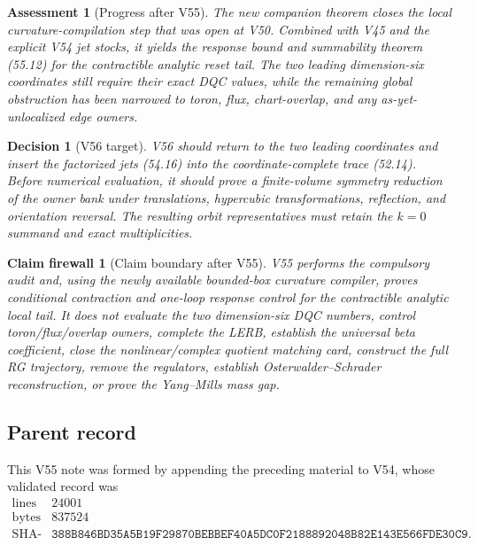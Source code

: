\documentclass[11pt,oneside]{book}
\newtheorem{assessment}[theorem]{Assessment}
\newtheorem{firewall}[theorem]{Claim firewall}
\newtheorem{decision}[theorem]{Decision}
\theoremstyle{definition}
\theoremstyle{remark}
\begin{document}
\begin{assessment}[Progress after V55]
\label{ass:e8v55-status}
The new companion theorem closes the local curvature-compilation
step that was open at V50.  Combined with V45 and the explicit V54
jet stocks, it yields the response bound and summability theorem
(55.12) for the contractible analytic reset tail.  The two leading
dimension-six coordinates still require their exact DQC values,
while the remaining global obstruction has been narrowed to toron,
flux, chart-overlap, and any as-yet-unlocalized edge owners.
\end{assessment}

\begin{decision}[V56 target]
\label{dec:e8v55-next}
V56 should return to the two leading coordinates and insert the
factorized jets (54.16) into the coordinate-complete trace (52.14).
Before numerical evaluation, it should prove a finite-volume
symmetry reduction of the owner bank under translations,
hypercubic transformations, reflection, and orientation reversal.
The resulting orbit representatives must retain the \(k=0\)
summand and exact multiplicities.
\end{decision}

\begin{firewall}[Claim boundary after V55]
\label{fire:e8v55-claim}
V55 performs the compulsory audit and, using the newly available
bounded-box curvature compiler, proves conditional contraction and
one-loop response control for the contractible analytic local
tail.  It does not evaluate the two dimension-six DQC numbers,
control toron/flux/overlap owners, complete the LERB, establish the
universal beta coefficient, close the nonlinear/complex quotient
matching card, construct the full RG trajectory, remove the
regulators, establish Osterwalder--Schrader reconstruction, or
prove the Yang--Mills mass gap.
\end{firewall}

\subsection{Parent record}

This V55 note was formed by appending the preceding material to V54,
whose validated record was
\[
\begin{array}{c|c}
\text{lines}&24001\\
\text{bytes}&837524\\
\text{SHA-256}&
\texttt{388B846BD35A5B19F29870BEBBEF40A5DC0F2188892048B82E143E566FDE30C9}.
\end{array}
\]
\end{document}
